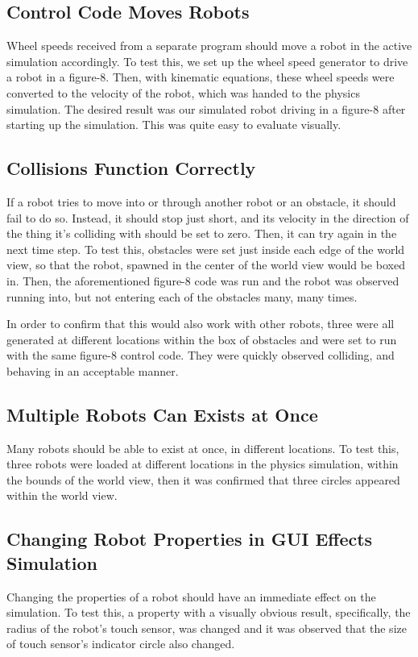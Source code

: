 \subsection{Control Code Moves Robots}
Wheel speeds received from a separate program should move a robot in the active simulation accordingly. To test this, we set up the wheel speed generator to drive a robot in a figure-8. Then, with kinematic equations, these wheel speeds were converted to the velocity of the robot, which was handed to the physics simulation. The desired result was our simulated robot driving in a figure-8 after starting up the simulation. This was quite easy to evaluate visually.

\subsection{Collisions Function Correctly}
If a robot tries to move into or through another robot or an obstacle, it should fail to do so. Instead, it should stop just short, and its velocity in the direction of the thing it's colliding with should be set to zero. Then, it can try again in the next time step. To test this, obstacles were set just inside each edge of the world view, so that the robot, spawned in the center of the world view would be boxed in. Then, the aforementioned figure-8 code was run and the robot was observed running into, but not entering each of the obstacles many, many times. 

In order to confirm that this would also work with other robots, three were all generated at different locations within the box of obstacles and were set to run with the same figure-8 control code. They were quickly observed colliding, and behaving in an acceptable manner.

\subsection{Multiple Robots Can Exists at Once}
Many robots should be able to exist at once, in different locations. To test this, three robots were loaded at different locations in the physics simulation, within the bounds of the world view, then it was confirmed that three circles appeared within the world view.

\subsection{Changing Robot Properties in GUI Effects Simulation}
Changing the properties of a robot should have an immediate effect on the simulation. To test this, a property with a visually obvious result, specifically, the radius of the robot's touch sensor, was changed and it was observed that the size of touch sensor's indicator circle also changed.

